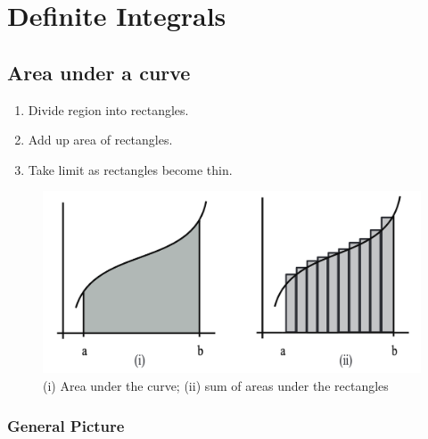 

\chapter{Definite Integrals}
\bigbreak

\section{Area under a curve}

\begin{enumerate}
	\item Divide region into rectangles.
	\item Add up area of rectangles.
	\item Take limit as rectangles become thin.
\end{enumerate}


\begin{figure}[ht!]
	\centering
	\includegraphics[scale=0.5]{./images/lecture_12_figure_1.png}
	\caption{(i) Area under the curve; (ii) sum of areas under the rectangles}
\end{figure}


\subsection{General Picture}

